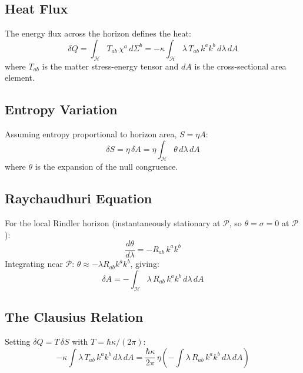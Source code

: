 \documentclass[aps,prd,twocolumn,superscriptaddress,nofootinbib]{revtex4-2}
\begin{document}
\subsection{Heat Flux}

The energy flux across the horizon defines the heat:
\begin{equation}
\delta Q = \int_{\mathcal{H}} T_{ab}\,\chi^a\,d\Sigma^b = -\kappa \int_{\mathcal{H}} \lambda\,T_{ab}\,k^a k^b\,d\lambda\,dA
\label{eq:heat}
\end{equation}
where $T_{ab}$ is the matter stress-energy tensor and $dA$ is the cross-sectional area element.

\subsection{Entropy Variation}

Assuming entropy proportional to horizon area, $S = \eta A$:
\begin{equation}
\delta S = \eta\,\delta A = \eta \int_{\mathcal{H}} \theta\,d\lambda\,dA
\label{eq:dS}
\end{equation}
where $\theta$ is the expansion of the null congruence.

\subsection{Raychaudhuri Equation}

For the local Rindler horizon (instantaneously stationary at $\mathcal{P}$, so $\theta = \sigma = 0$ at $\mathcal{P}$):
\begin{equation}
\frac{d\theta}{d\lambda} = -R_{ab}\,k^a k^b
\label{eq:raychaudhuri}
\end{equation}
Integrating near $\mathcal{P}$: $\theta \approx -\lambda R_{ab}k^a k^b$, giving:
\begin{equation}
\delta A = -\int_{\mathcal{H}} \lambda\,R_{ab}\,k^a k^b\,d\lambda\,dA
\label{eq:dA}
\end{equation}

\subsection{The Clausius Relation}

Setting $\delta Q = T\,\delta S$ with $T = \hbar\kappa/(2\pi)$:
\begin{equation}
-\kappa \int \lambda\,T_{ab}\,k^a k^b\,d\lambda\,dA = \frac{\hbar\kappa}{2\pi}\,\eta \left(-\int \lambda\,R_{ab}\,k^a k^b\,d\lambda\,dA\right)
\end{equation}
\end{document}

